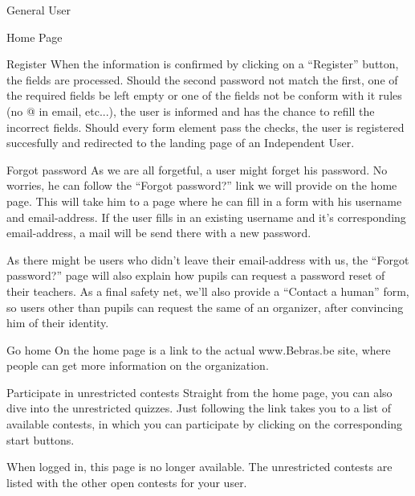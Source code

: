 \begin{section}{General User}
\begin{subsection}{Home Page}
\begin{subsubsection}{Register}
            When the information is confirmed by clicking on a ``Register''
            button, the fields are processed. Should the second password not
            match the first, one of the required fields be left empty or one of
            the fields not be conform with it rules (no @ in email, etc...), the
            user is informed and has the chance to refill the incorrect fields.
            Should every form element pass the checks, the user is registered
            succesfully and redirected to the landing page of an Independent
            User.
        \end{subsubsection}

        \begin{subsubsection}{Forgot password}
            As we are all forgetful, a user might forget his password. No
            worries, he can follow the ``Forgot password?'' link we will provide
            on the home page. This will take him to a page where he can fill in
            a form with his username and email-address. If the user fills in an
            existing username and it's corresponding email-address, a mail will
            be send there with a new password.

            As there might be users who didn't leave their email-address with
            us, the ``Forgot password?'' page will also explain how pupils can
            request a password reset of their teachers. As a final safety net,
            we'll also provide a ``Contact a human'' form, so users other than
            pupils can request the same of an organizer, after convincing him of
            their identity.
        \end{subsubsection}

        \begin{subsubsection}{Go home}
            On the home page is a link to the actual www.Bebras.be site, where
            people can get more information on the organization.
        \end{subsubsection}

        \begin{subsubsection}{Participate in unrestricted contests}
            Straight from the home page, you can also dive into the unrestricted
            quizzes. Just following the link takes you to a list of available
            contests, in which you can participate by clicking on the
            corresponding start buttons.

            When logged in, this page is no longer available. The unrestricted
            contests are listed with the other open contests for your user.
        \end{subsubsection}


\end{subsection}
\end{section}
